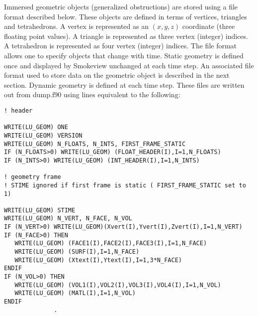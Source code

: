 \documentclass[12pt]{article}
\begin{document}
Immersed geometric objects (generalized obstructions) are stored using a file format described below.
These objects are defined in terms of vertices, triangles and tetrahedrons.
A vertex is represented as an $(x,y,z)$ coordinate (three floating point values).
A triangle is represented as three vertex (integer) indices.
A tetrahedron is represented
as four vertex (integer) indices.
The file format allows one to specify objects that change with time.
Static geometry is defined once and displayed by Smokeview unchanged at each time step. An associated file format used to store data  on the geometric object is described in the next section.
Dynamic geometry is defined at each time step.
These files are written out from {\ct dump.f90} using lines equivalent to the following:

\begin{lstlisting}
! header

WRITE(LU_GEOM) ONE
WRITE(LU_GEOM) VERSION
WRITE(LU_GEOM) N_FLOATS, N_INTS, FIRST_FRAME_STATIC
IF (N_FLOATS>0) WRITE(LU_GEOM) (FLOAT_HEADER(I),I=1,N_FLOATS)
IF (N_INTS>0) WRITE(LU_GEOM) (INT_HEADER(I),I=1,N_INTS)

! geometry frame
! STIME ignored if first frame is static ( FIRST_FRAME_STATIC set to 1)

WRITE(LU_GEOM) STIME
WRITE(LU_GEOM) N_VERT, N_FACE, N_VOL
IF (N_VERT>0) WRITE(LU_GEOM)(Xvert(I),Yvert(I),Zvert(I),I=1,N_VERT)
IF (N_FACE>0) THEN
   WRITE(LU_GEOM) (FACE1(I),FACE2(I),FACE3(I),I=1,N_FACE)
   WRITE(LU_GEOM) (SURF(I),I=1,N_FACE)
   WRITE(LU_GEOM) (Xtext(I),Ytext(I),I=1,3*N_FACE)
ENDIF
IF (N_VOL>0) THEN
   WRITE(LU_GEOM) (VOL1(I),VOL2(I),VOL3(I),VOL4(I),I=1,N_VOL)
   WRITE(LU_GEOM) (MATL(I),I=1,N_VOL)
ENDIF
              .
\end{lstlisting}
\end{document}
